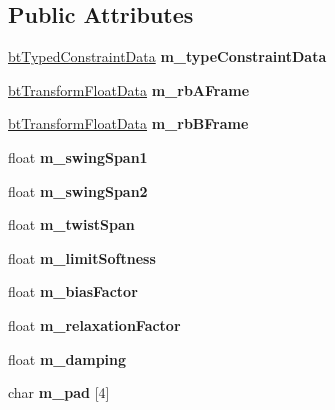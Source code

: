 \subsection*{Public Attributes}
\begin{DoxyCompactItemize}
\item 
\mbox{\label{structbtConeTwistConstraintData_a0bed6f14155f41a8b72be374a1353262}} 
\hyperlink{structbtTypedConstraintData}{bt\+Typed\+Constraint\+Data} {\bfseries m\+\_\+type\+Constraint\+Data}
\item 
\mbox{\label{structbtConeTwistConstraintData_a3d0681f2afeb8ff69db61fc7cf18bd6b}} 
\hyperlink{structbtTransformFloatData}{bt\+Transform\+Float\+Data} {\bfseries m\+\_\+rb\+A\+Frame}
\item 
\mbox{\label{structbtConeTwistConstraintData_a2abd2306ef1c60346f4ad31fa7fbc66a}} 
\hyperlink{structbtTransformFloatData}{bt\+Transform\+Float\+Data} {\bfseries m\+\_\+rb\+B\+Frame}
\item 
\mbox{\label{structbtConeTwistConstraintData_a0e9ac8295b4d6772e24a68c8bcf9b691}} 
float {\bfseries m\+\_\+swing\+Span1}
\item 
\mbox{\label{structbtConeTwistConstraintData_a9c760c7203c610e9d18e5735551a9f9a}} 
float {\bfseries m\+\_\+swing\+Span2}
\item 
\mbox{\label{structbtConeTwistConstraintData_af54538755bdc310aa8533dc69f60c4d6}} 
float {\bfseries m\+\_\+twist\+Span}
\item 
\mbox{\label{structbtConeTwistConstraintData_ad4bf6a3bd2b8af62dfa91fc8c610692c}} 
float {\bfseries m\+\_\+limit\+Softness}
\item 
\mbox{\label{structbtConeTwistConstraintData_aee612c3f1ecd4be8b4eee541e90247e3}} 
float {\bfseries m\+\_\+bias\+Factor}
\item 
\mbox{\label{structbtConeTwistConstraintData_a84157db329d52c7c79c7a271244f0317}} 
float {\bfseries m\+\_\+relaxation\+Factor}
\item 
\mbox{\label{structbtConeTwistConstraintData_a8238dcb16ff48b51f7efaff2bf066b74}} 
float {\bfseries m\+\_\+damping}
\item 
\mbox{\label{structbtConeTwistConstraintData_abbd38f4cea9fcff4c035a56be29f8c1f}} 
char {\bfseries m\+\_\+pad} \mbox{[}4\mbox{]}
\end{DoxyCompactItemize}


